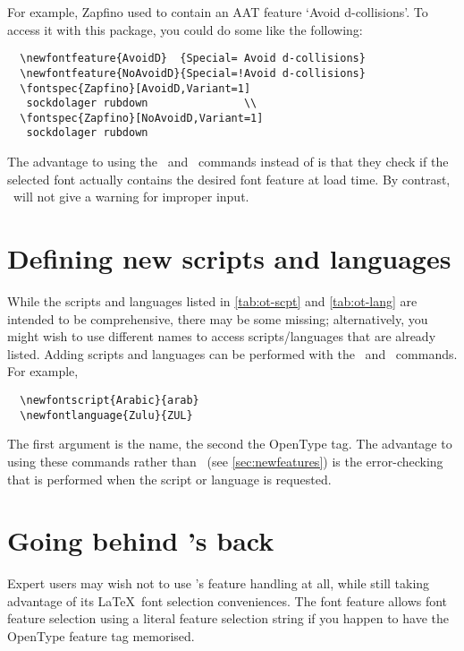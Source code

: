 \documentclass[a4paper]{l3doc}
\begin{document}
For example, Zapfino used to
contain an AAT feature `Avoid d-collisions'. To access it
with this package, you could do some like the following:

\begin{Verbatim}
  \newfontfeature{AvoidD}  {Special= Avoid d-collisions}
  \newfontfeature{NoAvoidD}{Special=!Avoid d-collisions}
  \fontspec{Zapfino}[AvoidD,Variant=1]
   sockdolager rubdown               \\
  \fontspec{Zapfino}[NoAvoidD,Variant=1]
   sockdolager rubdown
\end{Verbatim}

The advantage to using the \cmd\newAATfeature\ and \cmd\newopentypefeature\
commands instead of  is that they check if the selected font actually contains the desired font
feature at load time. By contrast, \cmd\newfontfeature\ will not give a warning
for improper input.


\section{Defining new scripts and languages}
\label{sec:newscriptlang}

\DescribeMacro{\newfontscript}
\DescribeMacro{\newfontlanguage}
While the scripts and languages listed in \ref{tab:ot-scpt} and \ref{tab:ot-lang}
are intended to be comprehensive, there may be some missing; alternatively,
you might wish to use different names to access scripts/languages that are
already listed.
Adding scripts and languages can be performed with the \cmd\newfontscript\
and \cmd\newfontlanguage\ commands. For example,
\begin{Verbatim}
  \newfontscript{Arabic}{arab}
  \newfontlanguage{Zulu}{ZUL}
\end{Verbatim}
The first argument is the  name, the second the OpenType
tag. The advantage to using these commands rather than \cmd\newfontfeature\
(see \vref{sec:newfeatures}) is the error-checking that is performed when
the script or language is requested.



\section{Going behind 's back}
Expert users may wish not to use 's feature handling at all,
while still taking advantage of its \LaTeX\ font selection conveniences. The
\feat{RawFeature} font feature allows font feature selection using a literal feature selection string if you happen to have the OpenType feature tag memorised.
\end{document}
